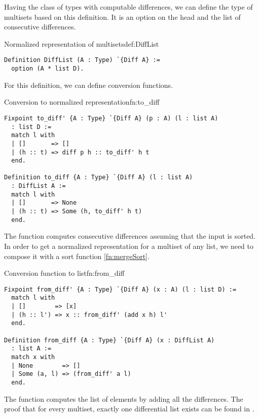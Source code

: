 Having the class of types with computable differences, we can define the type of multisets based on this definition. It is an option on the head and the list of consecutive differences.
\begin{defi}{Normalized representation of multisets}{def:DiffList}
\begin{verbatim}
Definition DiffList (A : Type) `{Diff A} :=
  option (A * list D).
\end{verbatim}
\end{defi}
For this definition, we can define conversion functions.
\begin{func}{Conversion to normalized representation}{fn:to_diff}
\begin{verbatim}
Fixpoint to_diff' {A : Type} `{Diff A} (p : A) (l : list A) 
  : list D :=
  match l with
  | []       => []
  | (h :: t) => diff p h :: to_diff' h t
  end.

Definition to_diff {A : Type} `{Diff A} (l : list A) 
  : DiffList A :=
  match l with
  | []       => None
  | (h :: t) => Some (h, to_diff' h t)
  end.
\end{verbatim}
\end{func}
The function  computes consecutive differences assuming that the input is sorted. In order to get a normalized representation for a multiset of any list, we need to compose it with a sort function \ref{fn:mergeSort}.
\begin{func}{Conversion function to list}{fn:from_diff}
\begin{verbatim}
Fixpoint from_diff' {A : Type} `{Diff A} (x : A) (l : list D) :=
  match l with
  | []        => [x]
  | (h :: l') => x :: from_diff' (add x h) l'
  end.

Definition from_diff {A : Type} `{Diff A} (x : DiffList A) 
  : list A :=
  match x with
  | None        => []
  | Some (a, l) => (from_diff' a l)
  end.
\end{verbatim}
\end{func}
The function  computes the list of elements by adding all the differences. The proof that for every multiset, exactly one differential list exists can be found in .
